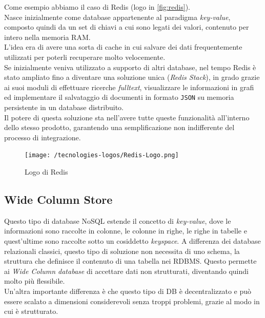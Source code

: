 \noindent Come esempio abbiamo il caso di Redis\cite{site:udemyredis} (logo in \autoref{fig:redis}).\\
Nasce inizialmente come database appartenente al paradigma \textit{key-value}, composto quindi da un set di chiavi a cui sono legati dei valori, contenuto per intero nella memoria RAM.\\
L'idea era di avere una sorta di cache in cui salvare dei dati frequentemente utilizzati per poterli recuperare molto velocemente.\\
Se inizialmente veniva utilizzato a supporto di altri database, nel tempo Redis è stato ampliato fino a diventare una soluzione unica (\textit{Redis Stack}), in grado grazie ai suoi moduli di effettuare ricerche \textit{fulltext}, visualizzare le informazioni in grafi ed implementare il salvataggio di documenti in formato \texttt{JSON} su memoria persistente in un \gls{database distribuito}.\\
Il potere di questa soluzione sta nell'avere tutte queste funzionalità all'interno dello stesso prodotto, garantendo una semplificazione non indifferente del processo di integrazione.

\begin{figure}[htbp]
\begin{center}
\texttt{[image: /tecnologies-logos/Redis-Logo.png]}
\caption{Logo di Redis}
\label{fig:redis}
\end{center}
\end{figure}

\subsection{Wide Column Store}
Questo tipo di database NoSQL estende il concetto di \textit{key-value}, dove le informazioni sono raccolte in colonne, le colonne in righe, le righe in tabelle e quest'ultime sono raccolte sotto un cosiddetto \textit{keyspace}. A differenza dei database relazionali classici, questo tipo di soluzione non necessita di uno schema, la struttura che definisce il contenuto di una tabella nei RDBMS. Questo permette ai \textit{Wide Column database} di accettare dati non strutturati, diventando quindi molto più flessibile.\\
Un'altra importante differenza è che questo tipo di DB è decentralizzato e può essere scalato a dimensioni considerevoli senza troppi problemi, grazie al modo in cui è strutturato.\\

